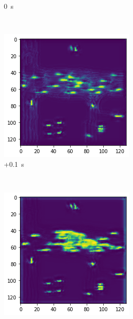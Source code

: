 \documentclass[12pt]{article}
\begin{document}
\begin{figure}[H]
\begin{subfigure}[b]{0.18\textwidth}
            \caption{0~s}
        \end{subfigure}
        ~
        \begin{subfigure}[b]{0.18\textwidth}
            \includegraphics[width=\textwidth]{output_opposite_3.png}
            \caption{+0.1~s}
        \end{subfigure}
        ~
        \begin{subfigure}[b]{0.18\textwidth}
            \includegraphics[width=\textwidth]{output_opposite_4.png}

\end{subfigure}
\end{figure}
\end{document}
